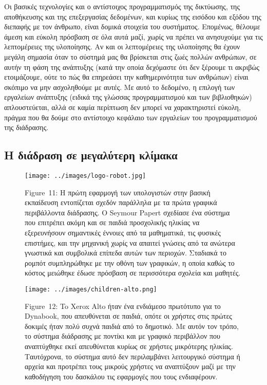\documentclass[
]{article}
\begin{document}
Οι βασικές τεχνολογίες και ο αντίστοιχος προγραμματισμός της δικτύωσης,
της αποθήκευσης και της επεξεργασίας δεδομένων, και κυρίως της εισόδου
και εξόδου της διεπαφής με τον άνθρωπο, είναι δομικά στοιχεία του
συστήματος. Επομένως, θέλουμε άμεση και εύκολη πρόσβαση σε όλα αυτά
μαζί, χωρίς να πρέπει να ανησυχούμε για τις λεπτομέρειες της υλοποίησης.
Αν και οι λεπτομέρειες της υλοποίησης θα έχουν μεγάλη σημασία όταν το
σύστημά μας θα βρίσκεται στις ζωές πολλών ανθρώπων, σε αυτήν τη φάση της
ανάπτυξης (κατά την οποία δεχόμαστε ότι δεν ξέρουμε τι ακριβώς
ετοιμάζουμε, ούτε το πώς θα επηρεάσει την καθημερινότητα των ανθρώπων)
είναι σκόπιμο να μην ασχοληθούμε με αυτές. Με αυτό το δεδομένο, η
επιλογή των εργαλείων ανάπτυξης (ειδικά της γλώσσας προγραμματισμού και
των βιβλιοθηκών) απλουστεύεται, αλλά σε καμία περίπτωση δεν μπορεί να
χαρακτηριστεί εύκολη, πράγμα που θα δούμε στο αντίστοιχο κεφάλαιο των
εργαλείων του προγραμματισμού της διάδρασης.

\hypertarget{ux3b7-ux3b4ux3b9ux3acux3b4ux3c1ux3b1ux3c3ux3b7-ux3c3ux3b5-ux3bcux3b5ux3b3ux3b1ux3bbux3cdux3c4ux3b5ux3c1ux3b7-ux3baux3bbux3afux3bcux3b1ux3baux3b1}{%
\subsection{Η διάδραση σε μεγαλύτερη
κλίμακα}\label{ux3b7-ux3b4ux3b9ux3acux3b4ux3c1ux3b1ux3c3ux3b7-ux3c3ux3b5-ux3bcux3b5ux3b3ux3b1ux3bbux3cdux3c4ux3b5ux3c1ux3b7-ux3baux3bbux3afux3bcux3b1ux3baux3b1}}

\leavevmode{}%
\begin{figure}
\hypertarget{fig:logo-robot}{%
\centering
\texttt{[image: ../images/logo-robot.jpg]}
\caption{Figure~11: Η πρώτη εφαρμογή των υπολογιστών στην βασική
εκπαίδευση εντοπίζεται σχεδόν παράλληλα με τα πρώτα γραφικά περιβάλλοντα
διάδρασης. Ο Seymour Papert σχεδίασε ένα σύστημα που επιτρέπει ακόμη και
σε παιδιά προσχολικής ηλικίας να εξερευνήσουν σημαντικές έννοιες από τα
μαθηματικά, τις φυσικές επιστήμες, και την μηχανική χωρίς να απαιτεί
γνώσεις από τα ανώτερα γνωστικά και συμβολικά επίπεδα αυτών των
περιοχών. Σταδιακά το ρομπότ συμπληρώθηκε με την οθόνη των γραφικών, η
οποία καθώς το κόστος μειώθηκε έδωσε πρόσβαση σε περισσότερα σχολεία και
μαθητές.}\label{fig:logo-robot}
}
\end{figure}

\leavevmode{}%
\begin{figure}
\hypertarget{fig:children-alto}{%
\centering
\texttt{[image: ../images/children-alto.png]}
\caption{Figure~12: To Xerox Alto ήταν ένα ενδιάμεσο πρωτότυπο για το
Dynabook, που απευθύνεται σε παιδιά, οπότε οι χρήστες στις πρώτες
δοκιμές ήταν πολύ συχνά παιδιά από το δημοτικό. Με αυτόν τον τρόπο, το
σύστημα διάδρασης με ποντίκι και με γραφικό περιβάλλον που αναπτύχθηκε
εκεί απευθύνεται κυρίως σε χρήστες μικρότερης ηλικίας. Ταυτόχρονα, το
σύστημα αυτό δεν περιλαμβάνει λειτουργικό σύστημα ή αρχεία και προτρέπει
τους μικρούς χρήστες να αναπτύξουν μαζί με την καθοδήγηση του δασκάλου
τις εφαρμογές που τους ενδιαφέρουν.}\label{fig:children-alto}
}
\end{figure}
\end{document}
